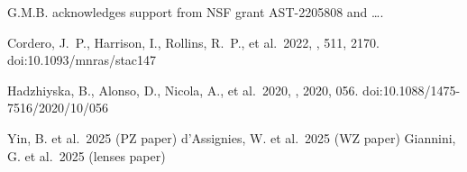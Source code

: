 \documentclass[linenumbers, onecolumn]{aastex63}
\begin{document}
  \begin{acknowledgments}


G.M.B. acknowledges support from NSF grant AST-2205808 and \ldots.

\end{acknowledgments}
\begin{thebibliography}{dummy}
%
%
 Cordero, J.~P., Harrison, I., Rollins, R.~P., et al.\ 2022, \mnras, 511, 2170. doi:10.1093/mnras/stac147

 Hadzhiyska, B., Alonso, D., Nicola, A., et al.\ 2020, \jcap, 2020, 056. doi:10.1088/1475-7516/2020/10/056

 Yin, B. et al.\ 2025 (PZ paper)
 d'Assignies, W. et al.\ 2025 (WZ paper)
 Giannini, G. et al.\ 2025 (lenses paper)
  
\end{thebibliography}
\end{document}
